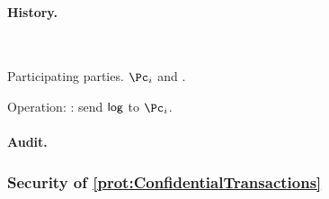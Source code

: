 \paragraph{History.}

\begin{protocol}~\label{prot:ConfidentialTransactions:History}
	\item[Participating parties.] $\Pc_i$ and \Cc.
		
	\item Operation: \Cc: send  $\mathsf{log}$ to $\Pc_i$.
	
\end{protocol}


\paragraph{Audit.} 


\subsubsection{Security of \cref{prot:ConfidentialTransactions}}
\begin{theorem}\label{thm:ConfidentialTransactions}
\end{theorem}


